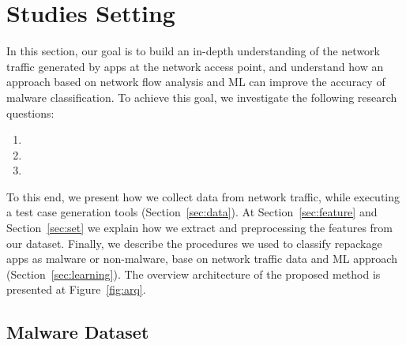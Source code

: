 \section{Studies Setting}\label{sec:Methodology}


In this section, our goal is to build an in-depth understanding of the network traffic generated by apps at the network access point, and understand how an approach based on network flow analysis and ML can improve the accuracy of malware classification. To achieve this goal, we investigate the following research questions:


\begin{enumerate}[(RQ1)]
\item \rqa
\item \rqb
\item \rqc
\end{enumerate}

To this end, we present how we collect data from network traffic, while executing a test case generation tools (Section~\ref{sec:data}). At Section~\ref{sec:feature} and Section~\ref{sec:set} we explain how we extract and preprocessing the features from our dataset. Finally, we describe the procedures we used to classify repackage apps as malware or non-malware, base on network traffic data and ML approach (Section~\ref{sec:learning}). The overview architecture of the proposed method is presented at Figure~\ref{fig:arq}.

\subsection{Malware Dataset}\label{sec:dataset}


